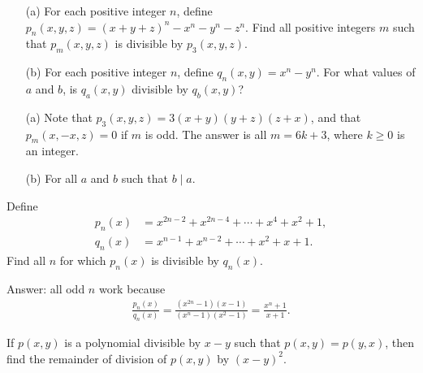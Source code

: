 \begin{tcolorbox}
\begin{question}
\begin{itemize}
    \item[(a)] For each positive integer $n$, define $p_n(x,y,z)=(x+y+z)^n - x^n - y^n - z^n$. Find all positive integers $m$ such that $p_m(x,y,z)$ is divisible by $p_3(x,y,z)$.
    \item[(b)] For each positive integer $n$, define $q_n(x,y)=x^n-y^n$. For what values of $a$ and $b$, is $q_a(x,y)$ divisible by $q_b(x,y)$?
\end{itemize}
\end{question}
\end{tcolorbox}

\begin{solution}[name=Solution by Parviz Shahriari]
\begin{itemize}
    \item[(a)] Note that $p_3(x,y,z)=3(x+y)(y+z)(z+x)$, and that $p_m(x,-x,z)=0$ if $m$ is odd. The answer is all $m=6k+3$, where $k\geq 0$ is an integer.
    \item[(b)] For all $a$ and $b$ such that $b \mid a$.
\end{itemize}
\end{solution}




\begin{tcolorbox}
\begin{question}
Define
\begin{align*}
    p_n(x) &= x^{2n-2} + x^{2n-4} + \cdots + x^4+x^2+1,\\
    q_n(x) &= x^{n-1} + x^{n-2} + \cdots + x^2 + x + 1.
\end{align*}
Find all $n$ for which $p_n(x)$ is divisible by $q_n(x)$.
\end{question}
\end{tcolorbox}

\begin{solution}[name=Solution by Parviz Shahriari]
Answer: all odd $n$ work because
\begin{align*}
    \frac{p_n(x)}{q_n(x)} = \frac{(x^{2n}-1)(x-1)}{(x^n-1)(x^2-1)} = \frac{x^n+1}{x+1}.
\end{align*}
\end{solution}




\begin{tcolorbox}
\begin{question}
If $p(x,y)$ is a polynomial divisible by $x-y$ such that $p(x,y)=p(y,x)$, then find the remainder of division of $p(x,y)$ by $(x-y)^2$. 
\end{question}
\end{tcolorbox}

